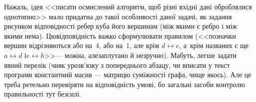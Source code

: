 На\nolinebreak[3] жаль, ідея <<писати осмислений алгоритм, щоб різні вхідні дані оброблялися однотипно>> мало придатна до такої особливості даної задачі, як задання рисунком відповідності ребер куба його вершинам (між якими є ребро і між якими нема). Цю\nolinebreak[3] відповідність важко сформулювати правилом (<<позначки вершин відрізняються або на~4, або на~1, але крім $d{\leftrightarrow}e$, а~крім названих є ще $a{\leftrightarrow}d$ і\nolinebreak[3] $e{\leftrightarrow}h$>>\nolinebreak[3] --- можна, але\nolinebreak[2] заплутано й незручно).  Мабуть, легше задати явний перелік (чи\nolinebreak[3] як у\nolinebreak[3] розв'язку з попереднього абзацу, чи вписати у текст програми константний масив --- матрицю суміжності графа, чи\nolinebreak[2] ще якось). Але це треба ретельно перевіряти на відповідність умові, бо загальні засоби контролю правильності тут безсилі.
